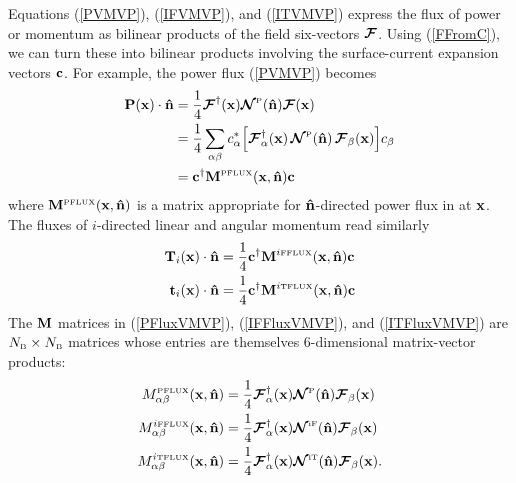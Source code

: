 \documentclass[letterpaper]{article}
\newcommand{\IFFlux}{^{i\text{\tiny FFLUX}}}
\newcommand{\ITFlux}{^{i\text{\tiny TFLUX}}}
\begin{document}
Equations (\ref{PVMVP}), (\ref{IFVMVP}), and (\ref{ITVMVP}) express
the flux of power or momentum as bilinear products of the field
six-vectors $\boldsymbol{\mathcal{F}}$. Using (\ref{FFromC}), we can turn these into
bilinear products involving the surface-current expansion vectors
$\mathbf{c}$. For example, the power flux (\ref{PVMVP}) becomes 
\begin{align}
 \mathbf{P}(\mathbf{x}) \cdot \mathbf{\hat n}
&=\frac{1}{4}\boldsymbol{\mathcal{F}}^\dagger(\mathbf{x}) \boldsymbol{\mathcal{N}}^{\hbox{\tiny{P}}}(\mathbf{\hat n}) \boldsymbol{\mathcal{F}}(\mathbf{x})
\nonumber \\
&=\frac{1}{4}\sum_{\alpha \beta} 
  c_\alpha^* 
  \Big[ \boldsymbol{\mathcal{F}}^\dagger_\alpha(\mathbf{x})
        \,
        \boldsymbol{\mathcal{N}}^{\hbox{\tiny{P}}}(\mathbf{\hat n})
        \,
        \boldsymbol{\mathcal{F}}_\beta(\mathbf{x})
  \Big]
  c_\beta 
\nonumber \\
&= \mathbf{c}^\dagger \mathbf{M}^{\hbox{\tiny{PFLUX}}}(\mathbf{x}, \mathbf{\hat n}) \mathbf{c} 
\label{PFluxVMVP}
\end{align}
where $\mathbf{M}^{\hbox{\tiny{PFLUX}}}(\mathbf{x},\mathbf{\hat n})$ is a matrix 
appropriate for $\mathbf{\hat n}$-directed power flux in at $\mathbf{x}$.
The fluxes of $i$-directed linear and angular momentum read
similarly
\begin{align}
\vb T_i(\vb x) \cdot \vbhat{n}
&= \frac{1}{4} \vb c^\dagger \vb M\IFFlux(\vb x, \vbhat{n}) \vb c 
\label{IFFluxVMVP}
\\
\vb t_i(\vb x) \cdot \vbhat{n}
&= \frac{1}{4} \vb c^\dagger \vb M\ITFlux(\vb x, \vbhat{n}) \vb c 
\label{ITFluxVMVP}
\end{align}
The $\mathbf{M}$ matrices in (\ref{PFluxVMVP}), (\ref{IFFluxVMVP}), and 
(\ref{ITFluxVMVP}) are $N_{\hbox{\tiny{B}}}\times N_{\hbox{\tiny{B}}}$ matrices
whose entries are themselves 6-dimensional matrix-vector products:
\begin{align*}
M_{\alpha\beta}\supt{PFLUX}(\vb x, \vbhat{n}) 
 &= \frac{1}{4} 
    \bmc F^\dagger_\alpha(\vb x) 
    \bmc N\supt{P}(\vbhat{n})
    \bmc F_\beta(\vb x) 
\\
M_{\alpha\beta}\IFFlux(\vb x, \vbhat{n})
 &= \frac{1}{4} 
    \bmc F^\dagger_\alpha(\vb x) 
    \bmc N\supt{iF}(\vbhat{n})
    \bmc F_\beta(\vb x) 
\\
M_{\alpha\beta}\ITFlux(\vb x, \vbhat{n})
 &= \frac{1}{4} 
    \bmc F^\dagger_\alpha(\vb x) 
    \bmc N\supt{iT}(\vbhat{n})
    \bmc F_\beta(\vb x).
\end{align*}

\end{document}
